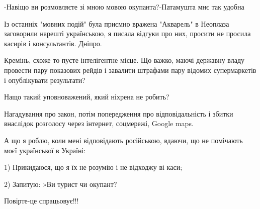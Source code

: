 \begin{itemize}
-Навіщо ви розмовляєте зі мною мовою окупанта?-Патамушта мнє так удобна

 

Із останніх "мовних подій" була приємно вражена "Акварель" в Неоплаза
заговорили нарешті українською, я писала відгуки про них, просити не просила
касирів і консультантів. Дніпро.


 

Кремінь, схоже то пусте інтелігентне місце. Що важко, маючі державну владу
провести пару показових рейдів і завалити штрафами пару відомих супермаркетів і
опублікувати результати?

Нащо такий уповноважений, який ніхрена не робить?


 
Нагадування про закон, потім попередження про відповідальність і збитки
внаслідок розголосу через інтернет, соцмережі, Google maps.

 

А що я роблю, коли мені відповідають російською, вдаючи, що не помічають моєї
української в Україні: 

1) Прикидаюся, що я їх не розумію і не відходжу ві каси; 

2) Запитую: »Ви турист чи окупант?

Повірте-це спрацьовує!!!


 


\end{itemize}
